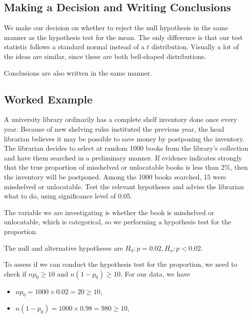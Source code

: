 \documentclass[
]{book}
\providecommand{\tightlist}{%
  \setlength{\itemsep}{0pt}\setlength{\parskip}{0pt}}
\begin{document}
\hypertarget{making-a-decision-and-writing-conclusions}{%
\subsection{Making a Decision and Writing Conclusions}\label{making-a-decision-and-writing-conclusions}}

We make our decision on whether to reject the null hypothesis in the same manner as the hypothesis test for the mean. The only difference is that our test statistic follows a standard normal instead of a \(t\) distribution. Visually a lot of the ideas are similar, since these are both bell-shaped distributions.

Conclusions are also written in the same manner.

\hypertarget{worked-example-6}{%
\subsection{Worked Example}\label{worked-example-6}}

A university library ordinarily has a complete shelf inventory done once every year. Because of new shelving rules instituted the previous year, the head librarian believes it may be possible to save money by postponing the inventory. The librarian decides to select at random 1000 books from the library's collection and have them searched in a preliminary manner. If evidence indicates strongly that the true proportion of misshelved or unlocatable books is less than 2\%, then the inventory will be postponed. Among the 1000 books searched, 15 were misshelved or unlocatable. Test the relevant hypotheses and advise the librarian what to do, using significance level of 0.05.

The variable we are investigating is whether the book is misshelved or unlocatable, which is categorical, so we performing a hypothesis test for the proportion.

The null and alternative hypotheses are \(H_0: p = 0.02, H_a: p < 0.02\).

To assess if we can conduct the hypothesis test for the proportion, we need to check if \(n p_0 \geq 10\) and \(n(1-p_0) \geq 10\). For our data, we have

\begin{itemize}
\tightlist
\item
  \(n p_0 = 1000 \times 0.02 = 20 \geq 10\),
\item
  \(n (1-p_0) = 1000 \times 0.98 = 980 \geq 10\),
\end{itemize}
\end{document}
